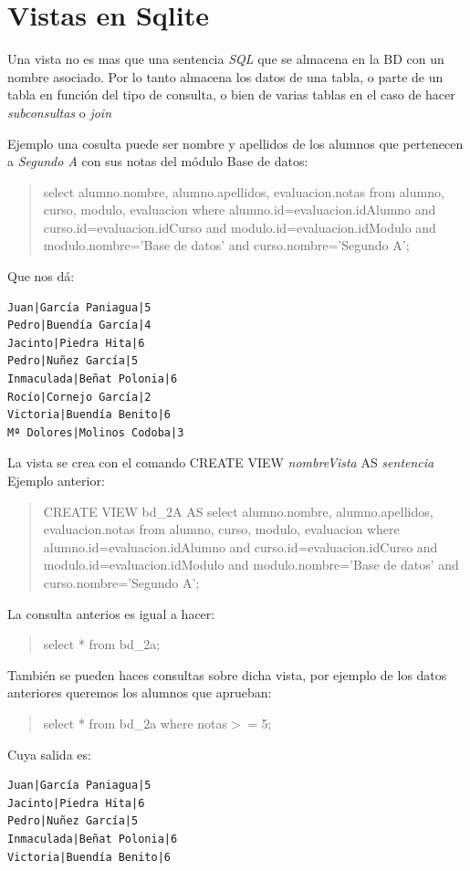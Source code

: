 \documentclass[4paper]{article}
\renewcommand{\S}{Sqlite }
\begin{document}
\section{Vistas en \S}
Una vista no es mas que una sentencia \emph{SQL} que se almacena en la BD con un nombre asociado. Por lo tanto almacena los datos de una tabla, o parte de un tabla en función del tipo de consulta, o bien de varias tablas en el caso de hacer \emph{subconsultas} o \emph{join}\par
Ejemplo una cosulta puede ser nombre y apellidos de los alumnos que pertenecen a \emph{Segundo A} con sus notas del módulo Base de datos:
\begin{quote}
select alumno.nombre, alumno.apellidos, evaluacion.notas from alumno, curso, modulo, evaluacion where alumno.id=evaluacion.idAlumno and curso.id=evaluacion.idCurso and modulo.id=evaluacion.idModulo and modulo.nombre='Base de datos' and curso.nombre='Segundo A';
\end{quote}
Que nos dá:
\begin{verbatim}
Juan|García Paniagua|5
Pedro|Buendía García|4
Jacinto|Piedra Hita|6
Pedro|Nuñez García|5
Inmaculada|Beñat Polonia|6
Rocío|Cornejo García|2
Victoria|Buendía Benito|6
Mª Dolores|Molinos Codoba|3
\end{verbatim}
La vista se crea con el comando CREATE VIEW \emph{nombreVista} AS \emph{sentencia}
Ejemplo anterior:
\begin{quote}
CREATE VIEW bd\_2A AS select alumno.nombre, alumno.apellidos, evaluacion.notas from alumno, curso, modulo, evaluacion where alumno.id=evaluacion.idAlumno and curso.id=evaluacion.idCurso and modulo.id=evaluacion.idModulo and modulo.nombre='Base de datos' and curso.nombre='Segundo A';
\end{quote}
La consulta anterios es igual a hacer:
\begin{quote}
select * from bd\_2a;
\end{quote}
También se pueden haces consultas sobre dicha vista, por ejemplo de los datos anteriores queremos los alumnos que aprueban:
\begin{quote}
select * from bd\_2a where notas$>=$5;
\end{quote}
Cuya salida es:
\begin{verbatim}
Juan|García Paniagua|5
Jacinto|Piedra Hita|6
Pedro|Nuñez García|5
Inmaculada|Beñat Polonia|6
Victoria|Buendía Benito|6
\end{verbatim}
\end{document}
